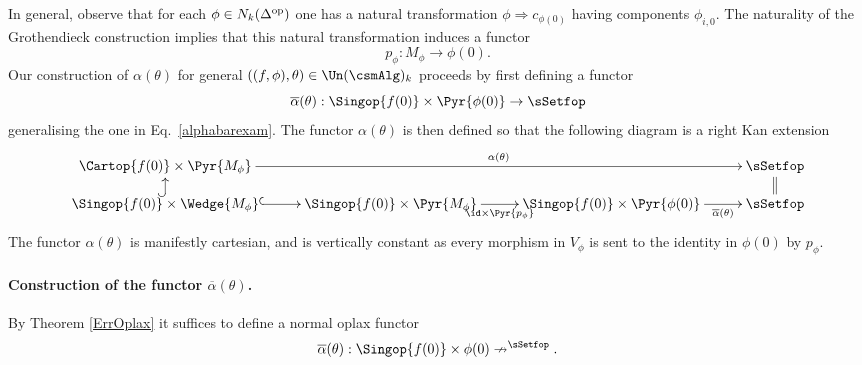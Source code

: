 \documentclass[a4paper]{article}
\numberwithin{equation}{section}
\begin{document}
In general, observe that for each $\phi \in N_k(\Delta^{\rm op})$ one has a natural transformation $\phi \Rightarrow c_{\phi(0)}$ having components $\phi_{i,0}$. The naturality of the Grothendieck construction implies that this natural transformation induces a functor 
\begin{equation*}
p_\phi:M_\phi \to \phi(0).
\end{equation*}
Our construction of $\alpha(\theta)$ for general $((f,\phi),\theta) \in \Un(\csmAlg)_k$ proceeds by first defining a functor
\begin{equation*}
 \overline{\alpha}(\theta):\Singop{f(0)}\times \Pyr{\phi(0)} \to \sSetfop
\end{equation*}
generalising the one in Eq.~\ref{alphabarexam}. The functor $\alpha(\theta)$ is then defined so that the following diagram is a right Kan extension
\begin{equation}
\label{RKEOutline}
 \xymatrixrowsep{.9pc}\xymatrixcolsep{2.2pc} \xymatrix{ \Cartop{f(0)}\times\Pyr{M_\phi} \ar[rrr]^-{\alpha(\theta)} & & & \sSetfop \\
 \Singop{f(0)}\times\Wedge{M_\phi} \ar@{^{(}->}[r] \ar@{^{(}->}[u] & \Singop{f(0)}\times\Pyr{M_\phi} \ar[r]_-{\id\times \Pyr{p_\phi}} & \Singop{f(0)}\times\Pyr{\phi(0)} \ar[r]_-{\overline{\alpha}(\theta)} & \sSetfop \ar@{=}[u]}
\end{equation}
The functor $\alpha(\theta)$ is manifestly cartesian, and is vertically constant as every morphism in $V_\phi$ is sent to the identity in $\phi(0)$ by $p_\phi$.

\paragraph{Construction of the functor $\overline{\alpha}(\theta)$.} By Theorem \ref{ErrOplax} it suffices to define a normal oplax functor
\begin{equation*}
 \overline{\alpha}(\theta): \Singop{f(0)}\times \phi(0) \nrightarrow \sp \sSetfop.
\end{equation*}
\end{document}
